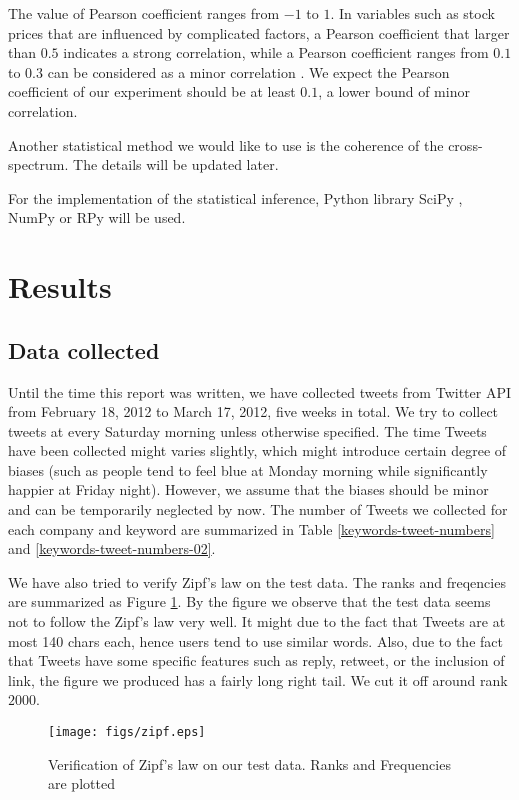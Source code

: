 \documentclass[12pt]{article}
\begin{document}
The value of Pearson coefficient ranges from $-1$ to $1$. In variables such as stock prices that are influenced by complicated factors, a Pearson coefficient that larger than $0.5$ indicates a strong correlation, while a Pearson coefficient ranges from $0.1$ to $0.3$ can be considered as a minor correlation \cite{Cohen:1988}. We expect the Pearson coefficient of our experiment should be at least $0.1$, a lower bound of minor correlation.

Another statistical method we would like to use is the coherence of the cross-spectrum. The details will be updated later.

For the implementation of the statistical inference, Python library SciPy \cite{SciPy}, NumPy \cite{NumPy} or RPy \cite{RPy} will be used.

\section{Results}

\subsection{Data collected}
Until the time this report was written, we have collected tweets from Twitter API from February 18, 2012 to March 17, 2012, five weeks in total. We try to collect tweets at every Saturday morning unless otherwise specified. The time Tweets have been collected might varies slightly, which might introduce certain degree of biases (such as people tend to feel blue at Monday morning while significantly happier at Friday night). However, we assume that the biases should be minor and can be temporarily neglected by now. The number of Tweets we collected for each company and keyword are summarized in Table \ref{keywords-tweet-numbers} and \ref{keywords-tweet-numbers-02}.

We have also tried to verify Zipf's law on the test data. The ranks and freqencies are summarized as Figure \ref{rank-freq}. By the figure we observe that the test data seems not to follow the Zipf's law very well. It might due to the fact that Tweets are at most 140 chars each, hence users tend to use similar words. Also, due to the fact that Tweets have some specific features such as reply, retweet, or the inclusion of link, the figure we produced has a fairly long right tail. We cut it off around rank $2000$.

\begin{figure}
\centering
    \texttt{[image: figs/zipf.eps]}
\caption{Verification of Zipf's law on our test data. Ranks and Frequencies are plotted}
\label{rank-freq}
\end{figure}
\end{document}
